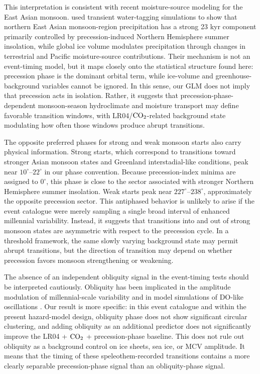 \documentclass[11pt]{article}
\begin{document}
This interpretation is consistent with recent moisture-source modeling for the East Asian monsoon. \citet{xie2023} used transient water-tagging simulations to show that northern East Asian monsoon-region precipitation has a strong 23 kyr component primarily controlled by precession-induced Northern Hemisphere summer insolation, while global ice volume modulates precipitation through changes in terrestrial and Pacific moisture-source contributions. Their mechanism is not an event-timing model, but it maps closely onto the statistical structure found here: precession phase is the dominant orbital term, while ice-volume and greenhouse-background variables cannot be ignored. In this sense, our GLM does not imply that precession acts in isolation. Rather, it suggests that precession-phase-dependent monsoon-season hydroclimate and moisture transport may define favorable transition windows, with LR04/\(\ce{CO2}\)-related background state modulating how often those windows produce abrupt transitions.

The opposite preferred phases for strong and weak monsoon starts also carry physical information. Strong starts, which correspond to transitions toward stronger Asian monsoon states and Greenland interstadial-like conditions, peak near \(10^\circ\)--\(22^\circ\) in our phase convention. Because precession-index minima are assigned to \(0^\circ\), this phase is close to the sector associated with stronger Northern Hemisphere summer insolation. Weak starts peak near \(227^\circ\)--\(238^\circ\), approximately the opposite precession sector. This antiphased behavior is unlikely to arise if the event catalogue were merely sampling a single broad interval of enhanced millennial variability. Instead, it suggests that transitions into and out of strong monsoon states are asymmetric with respect to the precession cycle. In a threshold framework, the same slowly varying background state may permit abrupt transitions, but the direction of transition may depend on whether precession favors monsoon strengthening or weakening.

The absence of an independent obliquity signal in the event-timing tests should be interpreted cautiously. Obliquity has been implicated in the amplitude modulation of millennial-scale variability and in model simulations of DO-like oscillations \citep{sun2021, hodell2023, zhang2021, malmierca2023}. Our result is more specific: in this event catalogue and within the present hazard-model design, obliquity phase does not show significant circular clustering, and adding obliquity as an additional predictor does not significantly improve the LR04 + \(\ce{CO2}\) + precession-phase baseline. This does not rule out obliquity as a background control on ice sheets, sea ice, or MCV amplitude. It means that the timing of these speleothem-recorded transitions contains a more clearly separable precession-phase signal than an obliquity-phase signal.
\end{document}

